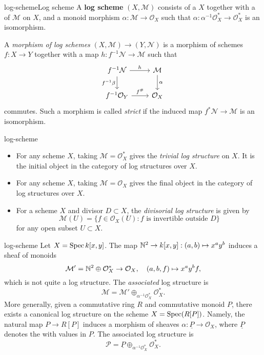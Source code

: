 \begin{topic}{log-scheme}{Log scheme}
    A \textbf{log scheme} $(X, \mathcal{M})$ consists of a  $X$ together with a  of  $\mathcal{M}$ on $X$, and a monoid morphism $\alpha : \mathcal{M} \to \mathcal{O}_X$ such that $\alpha : \alpha^{-1} \mathcal{O}_X^* \to \mathcal{O}_X^*$ is an isomorphism.
    
    A \textit{morphism of log schemes} $(X, \mathcal{M}) \to (Y, \mathcal{N})$ is a morphism of schemes $f : X \to Y$ together with a map $h : f^{-1} \mathcal{N} \to \mathcal{M}$ such that
    \[ \begin{tikzcd} f^{-1} \mathcal{N} \arrow{r}{h} \arrow[swap]{d}{f^{-1} \beta} & \mathcal{M} \arrow{d}{\alpha} \\ f^{-1} \mathcal{O}_Y \arrow{r}{f^\#} & \mathcal{O}_X \end{tikzcd} \]
    commutes. Such a morphism is called \textit{strict} if the induced map $f^* \mathcal{N} \to \mathcal{M}$ is an isomorphism.
\end{topic}

\begin{example}{log-scheme}
    \begin{itemize}
        \item For any scheme $X$, taking $\mathcal{M} = \mathcal{O}_X^*$ gives the \textit{trivial log structure} on $X$. It is the initial object in the category of log structures over $X$.
        \item For any scheme $X$, taking $\mathcal{M} = \mathcal{O}_X$ gives the final object in the category of log structures over $X$.
        \item For a scheme $X$ and divisor $D \subset X$, the \textit{divisorial log structure} is given by
        \[ \mathcal{M}(U) = \{ f \in \mathcal{O}_X(U) : f \text{ is invertible outside $D$} \} \]
        for any open subset $U \subset X$. 
    \end{itemize}
\end{example}

\begin{example}{log-scheme}
    Let $X = \operatorname{Spec} k[x, y]$. The map $\mathbb{N}^2 \to k[x, y] : (a, b) \mapsto x^a y^b$ induces a sheaf of monoids
    \[ \mathcal{M}' = \mathbb{N}^2 \oplus \mathcal{O}_X^* \to \mathcal{O}_X , \quad (a, b, f) \mapsto x^a y^b f , \]
    which is not quite a log structure. The \textit{associated} log structure is
    \[ \mathcal{M} = \mathcal{M}' \oplus_{\alpha^{-1} \mathcal{O}_X^*} \mathcal{O}_X^* . \]
    More generally, given a commutative ring $R$ and commutative monoid $P$, there exists a canonical log structure on the scheme $X = \operatorname{Spec}(R[P])$. Namely, the natural map $P \to R[P]$ induces a morphism of sheaves $\alpha : \underline{P} \to \mathcal{O}_X$, where $\underline{P}$ denotes the  with values in $P$. The associated log structure is
    \[ \mathcal{P} = \underline{P} \oplus_{\alpha^{-1} \mathcal{O}_X^*} \mathcal{O}_X^* . \]
\end{example}

